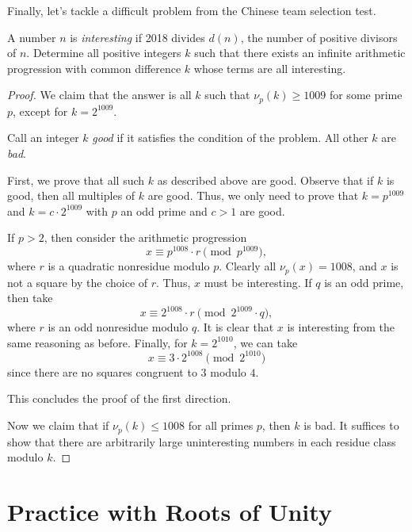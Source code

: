 \documentclass{scrartcl}
\begin{document}
Finally, let's tackle a difficult problem from the Chinese team selection test. 

\begin{example}
	A number $n$ is \emph{interesting} if 2018 divides $d(n)$, the number of 
	positive divisors of $n$. 
	Determine all positive integers $k$ such that there exists an infinite arithmetic progression 
	with common difference $k$ whose terms are all interesting.
\end{example}

\begin{proof}
	We claim that the answer is all $k$ such that $\nu_p(k)\ge 1009$ for some prime $p$, 
	except for $k=2^{1009}$. 
	
	\begin{definition*}
		Call an integer $k$ \emph{good} if it satisfies the condition of the problem. 
		All other $k$ are \emph{bad}. 
	\end{definition*}
	
	First, we prove that all such $k$ as described above are good. 
	Observe that if $k$ is good, then all multiples of $k$ are good. Thus, 
	we only need to prove that $k=p^{1009}$ and 
	$k=c\cdot 2^{1009}$ with $p$ an odd prime and $c>1$ are good.
	\begin{itemize}
		\ii If $p>2$, then consider the arithmetic progression 
		$$x\equiv p^{1008}\cdot r \pmod{p^{1009}},$$
		where $r$ is a quadratic nonresidue modulo $p$. 
		Clearly all $\nu_p(x)=1008$, and $x$ is not a square by the choice of $r$. 
		Thus, $x$ must be interesting. 
		\ii If $q$ is an odd prime, then take
		$$x\equiv 2^{1008} \cdot r \pmod{2^{1009}\cdot q},$$
		where $r$ is an odd nonresidue modulo $q$. 
		It is clear that $x$ is interesting from the same reasoning as before. 
		\ii Finally, for $k=2^{1010}$, we can take 
		$$x\equiv 3\cdot 2^{1008} \pmod {2^{1010}}$$
		since there are no squares congruent to $3$ modulo $4$. 
	\end{itemize} 
	This concludes the proof of the first direction. 
	
	Now we claim that if $\nu_p(k)\le 1008$ for all primes $p$, then $k$ is bad. 
	It suffices to show that there are arbitrarily large uninteresting numbers in each 
	residue class modulo $k$. 
\end{proof}

\section{Practice with Roots of Unity}
\end{document}

